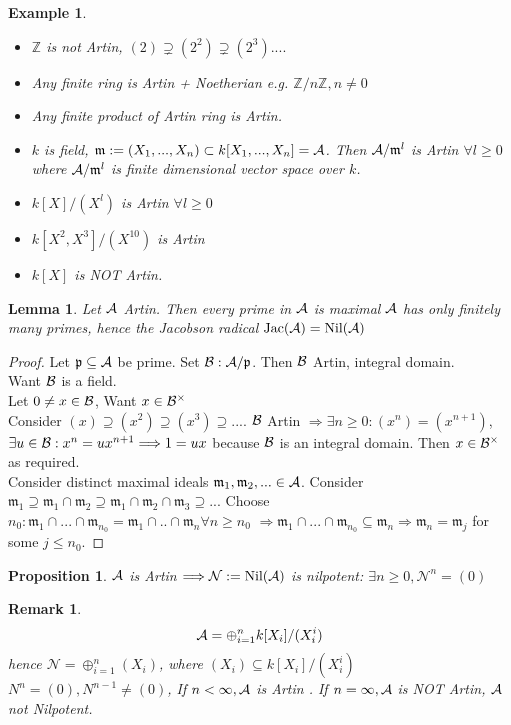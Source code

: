 \documentclass[11pt]{article}
\newtheorem{prop}[thm]{Proposition}
\newtheorem{lemma}[thm]{Lemma}
\newtheorem{rmk}[thm]{Remark}
\newtheorem{ex}[thm]{Example}
\newcommand{\intg}{\mathbb Z}
\newcommand{\scm}{{\mathfrak m}}
\newcommand{\scp}{{\mathfrak p}}
\newcommand{\cala}{{\cal A}}
\newcommand{\calb}{{\cal B}}
\newcommand{\Lrta}{\Longrightarrow}
\begin{document}
\begin{ex}\ 
\begin{itemize}
\item $\intg $ is not Artin,
$(2)\supsetneq (2^2)\supsetneq (2^3)....$
\item Any finite ring is Artin + Noetherian e.g. $\intg/n\intg,n\neq 0$
\item Any finite product of Artin ring is Artin.
\item $k$ is field, $\scm:=(X_1,...,X_n)\subset k[X_1,...,X_n]=\cala$. Then $\cala/\scm^l$ is Artin $\forall l\geq 0$ where $\cala/\scm^l$ is finite dimensional vector space over $k$.
\item $k[X]/(X^l)$ is Artin $\forall l\geq 0$
\item $k[X^2,X^3]/(X^{10})$ is Artin
\item $k[X]$ is NOT Artin.
\end{itemize}
\end{ex}

\begin{lemma}\label{lem:primes_are_maximal_in_Artin}
Let $\cala$ Artin. Then every prime in $\cala$ is maximal $\cala$ has only finitely many primes, hence the Jacobson radical $\text{Jac}(\cala)=\text{Nil}(  \cala)$
\end{lemma}
\begin{proof}
Let $\scp\subseteq \cala$ be prime. Set $\calb:\cala/\scp$. Then $\calb$ Artin, integral domain.
\\
Want $\calb$ is a field.\\
Let $0\neq x\in \calb$, Want $x\in \calb^\times$\\
Consider $(x)\supseteq (x^2)\supseteq (x^3)\supseteq...$. $\calb$ Artin $\Lrta \exists n\geq 0: (x^n)=(x^{n+1})$, $\exists u\in \calb:x^n=u x^{n+1}\Lrta 1=ux$ because $\calb$ is an integral domain. Then $x\in\calb^{\times}$ as required.\\
Consider distinct maximal ideals $\scm_1,\scm_2,...\in\cala$. Consider $\scm_1\supseteq \scm_1\cap \scm_2\supseteq \scm_1\cap\scm_2\cap \scm_3\supseteq ...$ Choose $n_0: \scm_1\cap...\cap \scm_{n_0}=\scm_1\cap..\cap\scm_n \forall n\geq n_0$ $\Lrta \scm_1\cap...\cap\scm_{n_0}\subseteq \scm_n\Lrta \scm_n=\scm_j$ for some $j\leq n_0$.
\end{proof}

\begin{prop}\label{prop:Artin_nilpotent_nilradical}
$\cala$ is Artin $\Lrta \mathcal{N}:=\text{Nil}(  \cala)$ is nilpotent: $\exists n\geq 0,\mathcal{N}^n=(0)$
\end{prop}
\begin{rmk}
$$
\cala=\oplus^n_{i=1}k[X_i]/(X^i_i)
$$
hence $\mathcal{N}=\oplus^n_{i=1}(X_i)$, where $(X_i)\subseteq k[X_i]/(X^i_i)$ $N^n=(0), N^{n-1}\neq (0)$, If $n<\infty, \cala$ is Artin . If $n=\infty, \cala$ is NOT Artin, $\cala$ not Nilpotent.
\end{rmk}
\end{document}

